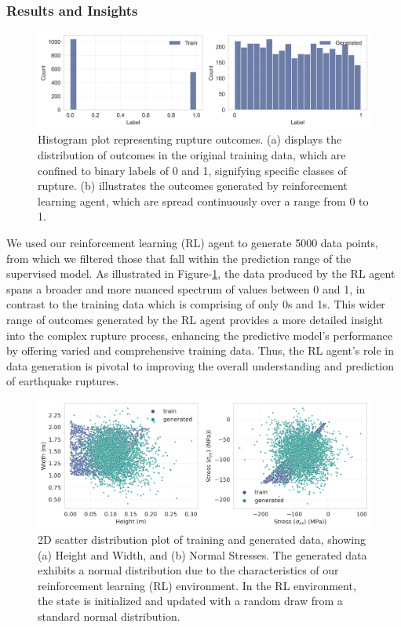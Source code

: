 \documentclass{article}
\begin{document}
\subsubsection{Results and Insights}
\begin{figure}[ht]
    \begin{center}
        \includegraphics[scale=0.5]{figures/label_histogram.png}
    \end{center}
    \caption{Histogram plot representing rupture outcomes. (a) displays the distribution of outcomes in the original training data, which are confined to binary labels of 0 and 1, signifying specific classes of rupture. (b) illustrates the outcomes generated by reinforcement learning agent, which are spread continuously over a range from 0 to 1.}
    \label{fig:label_distribution}
\end{figure}

We used our reinforcement learning (RL) agent to generate 5000 data points, from which we filtered those that fall within the prediction range of the supervised model. As illustrated in Figure-\ref{fig:label_distribution}, the data produced by the RL agent spans a broader and more nuanced spectrum of values between 0 and 1, in contrast to the training data which is comprising of only 0s and 1s. This wider range of outcomes generated by the RL agent provides a more detailed insight into the complex rupture process, enhancing the predictive model's performance by offering varied and comprehensive training data. Thus, the RL agent's role in data generation is pivotal to improving the overall understanding and prediction of earthquake ruptures.

\begin{figure}[ht]
    \begin{center}
        \includegraphics[scale=0.45]{figures/height_width_stress_scatter.png}
    \end{center}
    \caption{2D scatter distribution plot of training and generated data, showing (a) Height and Width, and (b) Normal Stresses. The generated data exhibits a normal distribution due to the characteristics of our reinforcement learning (RL) environment. In the RL environment, the state is initialized and updated with a random draw from a standard normal distribution.}
    \label{fig:height_width_stress_scatter}
\end{figure}
\end{document}
